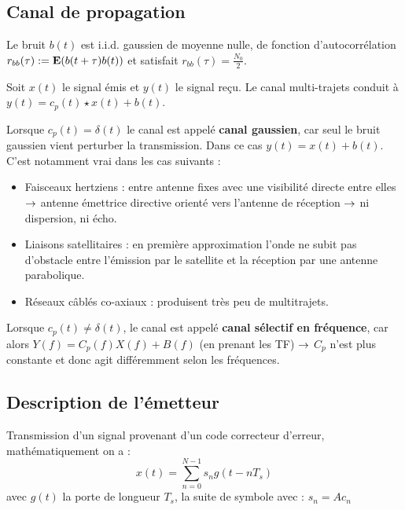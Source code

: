 \subsection{Canal de propagation}

	\begin{hyp}
		Le bruit $b(t)$ est i.i.d. gaussien de moyenne nulle, de fonction d'autocorrélation $r_{bb}(\tau) := \mathbf{E}(b(t + \tau) b(t))$ et satisfait $r_{bb}(\tau) = \frac{N_0}{2}$.
	\end{hyp}
	
	\begin{pop}
		Soit $x(t)$ le signal émis et $y(t)$ le signal reçu.
		Le canal multi-trajets conduit à $y(t) = c_p(t) \star x(t) + b(t)$.
	\end{pop}
	
	Lorsque $c_p(t) = \delta(t)$ le canal est appelé \textbf{canal gaussien}, car seul le bruit gaussien vient perturber la transmission.
	Dans ce cas $y(t) = x(t) + b(t)$.
	C'est notamment vrai dans les cas suivants :
	\begin{itemize}
	\item[\textbullet] Faisceaux hertziens : entre antenne fixes avec une visibilité directe entre elles $\rightarrow$ antenne émettrice directive orienté vers l'antenne de réception $\rightarrow$ ni dispersion, ni écho.
	\item[\textbullet] Liaisons satellitaires : en première approximation l'onde ne subit pas d'obstacle entre l'émission par le satellite et la réception par une antenne parabolique.
	\item[\textbullet] Réseaux câblés co-axiaux : produisent très peu de multitrajets.
	\end{itemize}
	
	Lorsque $c_p(t) \neq \delta(t)$, le canal est appelé \textbf{canal sélectif en fréquence}, car alors $Y(f) = C_p(f) X(f) + B(f)$ (en prenant les TF) $\rightarrow$ $C_p$ n'est plus constante et donc agit différemment selon les fréquences.
		

\subsection{Description de l'émetteur}

	\begin{defn}
	Transmission d'un signal provenant d'un code correcteur d'erreur, mathématiquement on a :
	$$x(t)=\sum_{n=0}^{N-1} s_{n}g(t-nT_{s})$$
	avec $g(t)$ la porte de longueur $T_{s}$, la suite de symbole avec : $s_{n}=Ac_{n}$
	\end{defn}
	
